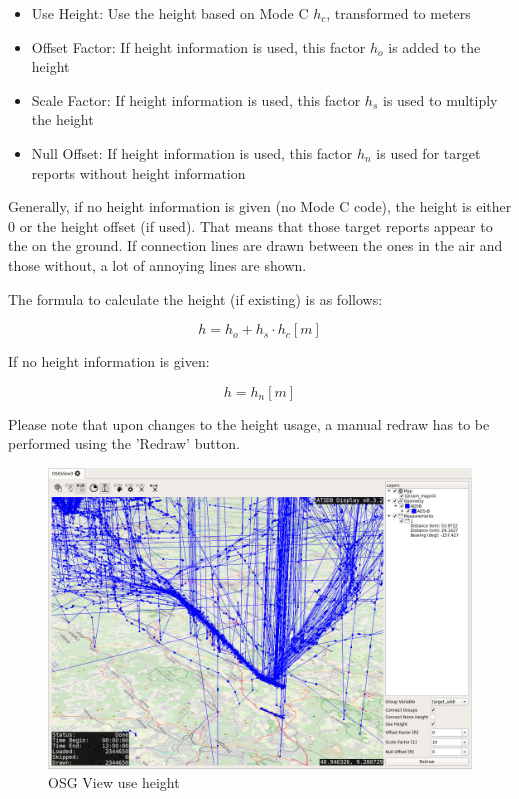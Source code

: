 \begin{itemize}
 \item Use Height: Use the height based on Mode C $h_c$, transformed to meters
 \item Offset Factor: If height information is used, this factor $h_o$ is added to the height
 \item Scale Factor: If height information is used, this factor $h_s$ is used to multiply the height
 \item Null Offset: If height information is used, this factor $h_n$ is used for target reports without height information
\end{itemize}

Generally, if no height information is given (no Mode C code), the height is either $0$ or the height offset (if used). That means that those target reports appear to the on the ground. If connection lines are drawn between the ones in the air and those without, a lot of annoying lines are shown.

The formula to calculate the height (if existing) is as follows:

$$ h = h_o + h_s \cdot h_c [m]$$ 

If no height information is given:

$$ h = h_n [m]$$ 

Please note that upon changes to the height usage, a manual redraw has to be performed using the 'Redraw' button.


\begin{figure}[H]
    \hspace*{-2cm}
    \includegraphics[width=18cm,frame]{../screenshots/osgview_use_height.png}
  \caption{OSG View use height}
\end{figure}

